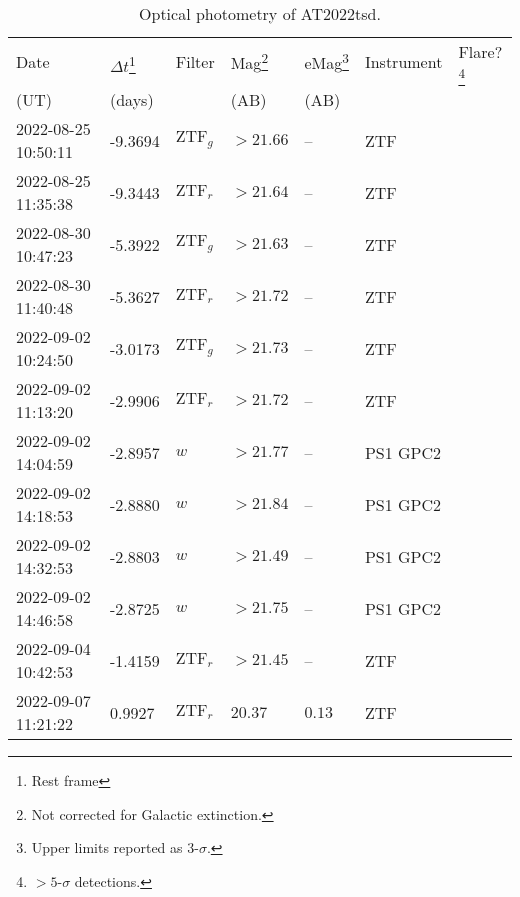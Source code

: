 \documentclass{nature_plusfigure}
\begin{document}
\clearpage

\begin{supplement}

\renewcommand{\thefigure}{Supplementary Information Figure~\arabic{figure}}
\renewcommand{\figurename}{}
\setcounter{figure}{0}
%


\renewcommand{\thetable}{Supplementary Information Table~\arabic{table}}
 \renewcommand{\tablename}{}
\setcounter{table}{0}

\begin{center} 
\begin{longtable}{lllllll} 
\caption{Optical photometry of AT2022tsd.} 
\label{tab:optical-photometry}\\ 
\hline\hline
Date & $\Delta t$\footnote{Rest frame} & Filter & Mag\footnote{Not corrected for Galactic extinction.} & eMag\footnote{Upper limits reported as 3-$\sigma$.} & Instrument & Flare?\footnote{$>5$-$\sigma$ detections.}\\ 
(UT) & (days) &  & (AB) & (AB) &  & \\ 
\hline
2022-08-25 10:50:11 & -9.3694 & $\mathrm{ZTF}_{g}$ & $>21.66$ & -- & ZTF &  \\ 
2022-08-25 11:35:38 & -9.3443 & $\mathrm{ZTF}_{r}$ & $>21.64$ & -- & ZTF &  \\ 
2022-08-30 10:47:23 & -5.3922 & $\mathrm{ZTF}_{g}$ & $>21.63$ & -- & ZTF &  \\ 
2022-08-30 11:40:48 & -5.3627 & $\mathrm{ZTF}_{r}$ & $>21.72$ & -- & ZTF &  \\ 
2022-09-02 10:24:50 & -3.0173 & $\mathrm{ZTF}_{g}$ & $>21.73$ & -- & ZTF &  \\ 
2022-09-02 11:13:20 & -2.9906 & $\mathrm{ZTF}_{r}$ & $>21.72$ & -- & ZTF &  \\ 
2022-09-02 14:04:59 & -2.8957 & $w$ & $>21.77$ & -- & PS1 GPC2 &  \\ 
2022-09-02 14:18:53 & -2.8880 & $w$ & $>21.84$ & -- & PS1 GPC2 &  \\ 
2022-09-02 14:32:53 & -2.8803 & $w$ & $>21.49$ & -- & PS1 GPC2 &  \\ 
2022-09-02 14:46:58 & -2.8725 & $w$ & $>21.75$ & -- & PS1 GPC2 &  \\ 
2022-09-04 10:42:53 & -1.4159 & $\mathrm{ZTF}_{r}$ & $>21.45$ & -- & ZTF &  \\ 
2022-09-07 11:21:22 & 0.9927 & $\mathrm{ZTF}_{r}$ & $20.37$ & $0.13$ & ZTF &  \\ 

\end{longtable}
\end{center}
\end{supplement}
\end{document}
